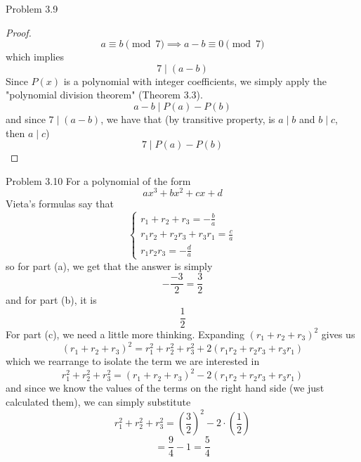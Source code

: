 \begin{sol}{Problem 3.9}
\begin{proof}
\[
a \equiv b \pmod{7} \implies a - b \equiv 0 \pmod{7}
\]
which implies
\[
7 \mid (a - b)
\]
Since $P(x)$ is a polynomial with integer coefficients, we simply apply the "polynomial division theorem" (Theorem 3.3).
\[
a - b \mid P(a) - P(b)
\]
and since $7 \mid (a-b)$, we have that (by transitive property, is $a \mid b$ and $b \mid c$, then $a \mid c$)
\[
7 \mid P(a) - P(b)
\]
\end{proof}
\end{sol}

\begin{sol}{Problem 3.10}
For a polynomial of the form 
\[
ax^3 + bx^2 + cx + d
\]
Vieta's formulas say that
\[
\begin{cases}
r_1 + r_2 + r_3 = -\frac{b}{a} \\
r_1r_2 + r_2r_3 + r_3r_1 = \frac{c}{a} \\
r_1r_2r_3 = -\frac{d}{a}
\end{cases}
\]
so for part (a), we get that the answer is simply
\[
-\frac{-3}{2} = \boxed{\frac{3}{2}}
\]
and for part (b), it is
\[
\boxed{\frac{1}{2}}
\]
For part (c), we need a little more thinking. Expanding $(r_1 + r_2 + r_3)^2$ gives us
\[
(r_1 + r_2 + r_3)^2 = r_1^2 + r_2^2 + r_3^2 + 2(r_1r_2 + r_2r_3 + r_3r_1)
\]
which we rearrange to isolate the term we are interested in
\[
r_1^2 + r_2^2 + r_3^2 = (r_1 + r_2 + r_3)^2 - 2(r_1r_2 + r_2r_3 + r_3r_1)
\]
and since we know the values of the terms on the right hand side (we just calculated them), we can simply substitute
\[
r_1^2 + r_2^2 + r_3^2 = \left(\frac{3}{2}\right)^2 - 2 \cdot \left(\frac{1}{2}\right) 
\]
\[
= \frac{9}{4} - 1  = \boxed{\frac{5}{4}}
\]
\end{sol}

